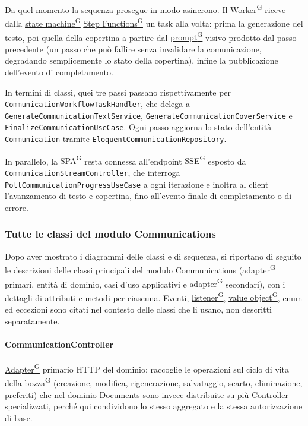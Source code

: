 \documentclass[a4paper,12pt]{article}
\providecommand{\glslink}[2]{\href{https://alittlebyte-19.github.io/Documentazione/glossario.html\#gls-#1}{\underline{#2}\textsuperscript{\scriptsize G}}}
\begin{document}
\begin{sloppypar}
Da quel momento la sequenza prosegue in modo asincrono. Il \glslink{worker}{Worker} riceve dalla \glslink{state-machine}{state machine} \glslink{step-functions}{Step Functions} un task alla volta: prima la generazione del testo, poi quella della copertina a partire dal \glslink{prompt}{prompt} visivo prodotto dal passo precedente (un passo che può fallire senza invalidare la comunicazione, degradando semplicemente lo stato della copertina), infine la pubblicazione dell'evento di completamento.

In termini di classi, quei tre passi passano rispettivamente per \texttt{CommunicationWorkflowTaskHandler}, che delega a \texttt{GenerateCommunicationTextService}, \texttt{GenerateCommunicationCoverService} e \texttt{FinalizeCommunicationUseCase}. Ogni passo aggiorna lo stato dell'entità \texttt{Communication} tramite \texttt{EloquentCommunicationRepository}.

In parallelo, la \glslink{spa-single-page-application}{SPA} resta connessa all'endpoint \glslink{sse-server-sent-events}{SSE} esposto da \texttt{CommunicationStreamController}, che interroga \texttt{PollCommunicationProgressUseCase} a ogni iterazione e inoltra al client l'avanzamento di testo e copertina, fino all'evento finale di completamento o di errore.

\subsubsection{Tutte le classi del modulo Communications}

Dopo aver mostrato i diagrammi delle classi e di sequenza, si riportano di seguito le descrizioni delle classi principali del modulo Communications (\glslink{adapter}{adapter} primari, entità di dominio, casi d'uso applicativi e \glslink{adapter}{adapter} secondari), con i dettagli di attributi e metodi per ciascuna. Eventi, \glslink{listener}{listener}, \glslink{value-object}{value object}, enum ed eccezioni sono citati nel contesto delle classi che li usano, non descritti separatamente.

\paragraph{CommunicationController}

\glslink{adapter}{Adapter} primario HTTP del dominio: raccoglie le operazioni sul ciclo di vita della \glslink{bozza-draft}{bozza} (creazione, modifica, rigenerazione, salvataggio, scarto, eliminazione, preferiti) che nel dominio Documents sono invece distribuite su più Controller specializzati, perché qui condividono lo stesso aggregato e la stessa autorizzazione di base.


\end{sloppypar}
\end{document}
